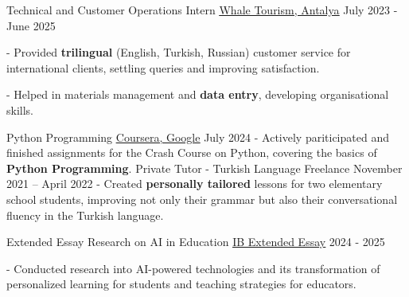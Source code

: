 \documentclass[11pt]{spidercv}
\begin{document}
    





    \begin{MainPart}

    \Experience
    {\ColorHighlight}
    {Technical and Customer Operations Intern}
    {\href{https://maps.app.goo.gl/WLid8BdGkR1ZooLA9}{\textcolor[HTML]{2d6930}{\underline{Whale Tourism, Antalya}}}}
    {July 2023 - June 2025}
    {   
        - Provided \textbf{trilingual} (English, Turkish, Russian) customer service for international clients, settling queries and improving satisfaction.
        
        - Helped in materials management and \textbf{data entry}, developing organisational skills.
    }
    \Experience
        {\ColorHighlight}
		{Python Programming}
		{\href{https://www.coursera.org/learn/python-crash-course}{\textcolor[HTML]{2d6930}{\underline{Coursera, Google}}}}
        {July 2024}
        {   
            - Actively pariticipated and finished assignments for the Crash Course on Python, covering the basics of \textbf{Python Programming}.
        }
    \Experience
        {\ColorHighlight}
		{Private Tutor - Turkish Language}
		{Freelance}
        {November 2021 – April 2022}
        {   
            - Created \textbf{personally tailored} lessons for two elementary school students, improving not only their grammar but also their conversational fluency in the Turkish language.
        }


    
    \Experience
        {\ColorHighlight}
		{Extended Essay Research on AI in Education}
		{\href{https://drive.google.com/drive/folders/1X9cIlZSxB4-iGQERWRIIcoJ-b6BauQJH?usp=sharing}{\textcolor[HTML]{2d6930}{\underline{IB Extended Essay}}}}
        {2024 - 2025}
        {   
            - Conducted research into AI-powered technologies and its transformation of personalized learning for students and teaching strategies for educators. 
            
}
\end{MainPart}
\end{document}
